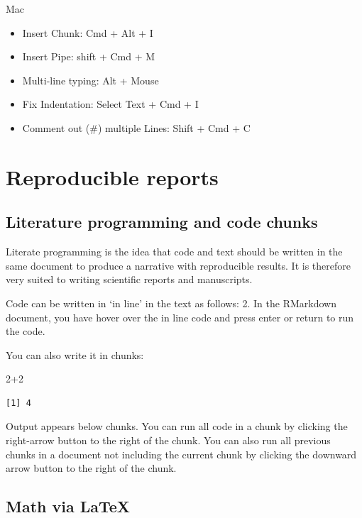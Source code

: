 \documentclass[
  letterpaper,
  DIV=11,
  numbers=noendperiod]{scrreprt}
\newenvironment{Shaded}{\begin{snugshade}}{\end{snugshade}}
\newcommand{\DecValTok}[1]{\textcolor[rgb]{0.68,0.00,0.00}{#1}}
\newcommand{\SpecialCharTok}[1]{\textcolor[rgb]{0.37,0.37,0.37}{#1}}
\providecommand{\tightlist}{%
  \setlength{\itemsep}{0pt}\setlength{\parskip}{0pt}}\usepackage{longtable,booktabs,array}
\begin{document}
Mac

\begin{itemize}
\tightlist
\item
  Insert Chunk: Cmd + Alt + I
\item
  Insert Pipe: shift + Cmd + M
\item
  Multi-line typing: Alt + Mouse
\item
  Fix Indentation: Select Text + Cmd + I
\item
  Comment out (\#) multiple Lines: Shift + Cmd + C
\end{itemize}


\chapter{Reproducible reports}\label{reproducible-reports}

\section{Literature programming and code
chunks}\label{literature-programming-and-code-chunks}

Literate programming is the idea that code and text should be written in
the same document to produce a narrative with reproducible results. It
is therefore very suited to writing scientific reports and manuscripts.

Code can be written in `in line' in the text as follows: 2. In the
RMarkdown document, you have hover over the in line code and press enter
or return to run the code.

You can also write it in chunks:

\begin{Shaded}
\begin{Highlighting}[]
\DecValTok{2}\SpecialCharTok{+}\DecValTok{2}
\end{Highlighting}
\end{Shaded}

\begin{verbatim}
[1] 4
\end{verbatim}

Output appears below chunks. You can run all code in a chunk by clicking
the right-arrow button to the right of the chunk. You can also run all
previous chunks in a document not including the current chunk by
clicking the downward arrow button to the right of the chunk.

\section{Math via LaTeX}\label{math-via-latex}
\end{document}
